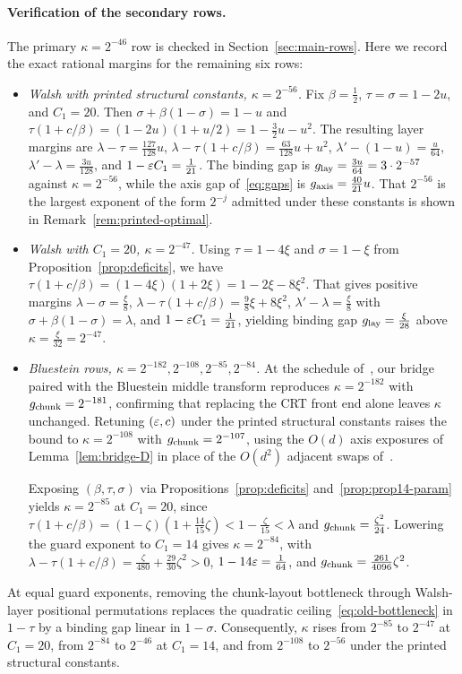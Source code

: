 \paragraph{Verification of the secondary rows.}
The primary $\kappa=2^{-46}$ row is checked in Section~\ref{sec:main-rows}. Here we record the exact rational margins for the remaining six rows:
\begin{itemize}[leftmargin=*,itemsep=2pt]
\item \emph{Walsh with printed structural constants, $\kappa=2^{-56}$.} Fix $\beta=\frac12$, $\tau=\sigma=1-2u$, and $C_1=20$. Then $\sigma+\beta(1-\sigma)=1-u$ and $\tau(1+c/\beta)=(1-2u)(1+u/2)=1-\frac32u-u^2$. The resulting layer margins are $\lambda-\tau=\frac{127}{128}u$, $\lambda-\tau(1+c/\beta)=\frac{63}{128}u+u^2$, $\lambda'-(1-u)=\frac{u}{64}$, $\lambda'-\lambda=\frac{3u}{128}$, and $1-\varepsilon C_1=\frac1{21}$. The binding gap is $g_{\rm lay}=\frac{3u}{64}=3\cdot2^{-57}$ against $\kappa=2^{-56}$, while the axis gap of~\eqref{eq:gaps} is $g_{\rm axis}=\frac{40}{21}u$. That $2^{-56}$ is the largest exponent of the form $2^{-j}$ admitted under these constants is shown in Remark~\ref{rem:printed-optimal}.

\item \emph{Walsh with $C_1=20$, $\kappa=2^{-47}$.} Using $\tau=1-4\xi$ and $\sigma=1-\xi$ from Proposition~\ref{prop:deficits}, we have $\tau(1+c/\beta)=(1-4\xi)(1+2\xi)=1-2\xi-8\xi^2$. That gives positive margins $\lambda-\sigma=\frac\xi8$, $\lambda-\tau(1+c/\beta)=\frac98\xi+8\xi^2$, $\lambda'-\lambda=\frac\xi8$ with $\sigma+\beta(1-\sigma)=\lambda$, and $1-\varepsilon C_1=\frac1{21}$, yielding binding gap $g_{\rm lay}=\frac\xi{28}$ above $\kappa=\frac\xi{32}=2^{-47}$.

\item \emph{Bluestein rows, $\kappa=2^{-182},2^{-108},2^{-85},2^{-84}$.} At the schedule of~\cite[(38)]{OAI26}, our bridge paired with the Bluestein middle transform reproduces $\kappa=2^{-182}$ with $g_{\rm chunk}=2^{-181}$, confirming that replacing the CRT front end alone leaves $\kappa$ unchanged. Retuning $(\varepsilon,c)$ under the printed structural constants raises the bound to $\kappa=2^{-108}$ with $g_{\rm chunk}=2^{-107}$, using the $O(d)$ axis exposures of Lemma~\ref{lem:bridge-D} in place of the $O(d^2)$ adjacent swaps of~\cite[\S9]{OAI26}.

Exposing $(\beta,\tau,\sigma)$ via Propositions~\ref{prop:deficits} and~\ref{prop:prop14-param} yields $\kappa=2^{-85}$ at $C_1=20$, since $\tau(1+c/\beta)=(1-\zeta)(1+\frac{14}{15}\zeta)<1-\frac\zeta{15}<\lambda$ and $g_{\rm chunk}=\frac{\zeta^2}{24}$. Lowering the guard exponent to $C_1=14$ gives $\kappa=2^{-84}$, with $\lambda-\tau(1+c/\beta)=\frac\zeta{480}+\frac{29}{30}\zeta^2>0$, $1-14\varepsilon=\frac1{64}$, and $g_{\rm chunk}=\frac{261}{4096}\zeta^2$.
\end{itemize}

At equal guard exponents, removing the chunk-layout bottleneck through Walsh-layer positional permutations replaces the quadratic ceiling~\eqref{eq:old-bottleneck} in $1-\tau$ by a binding gap linear in $1-\sigma$. Consequently, $\kappa$ rises from $2^{-85}$ to $2^{-47}$ at $C_1=20$, from $2^{-84}$ to $2^{-46}$ at $C_1=14$, and from $2^{-108}$ to $2^{-56}$ under the printed structural constants.

